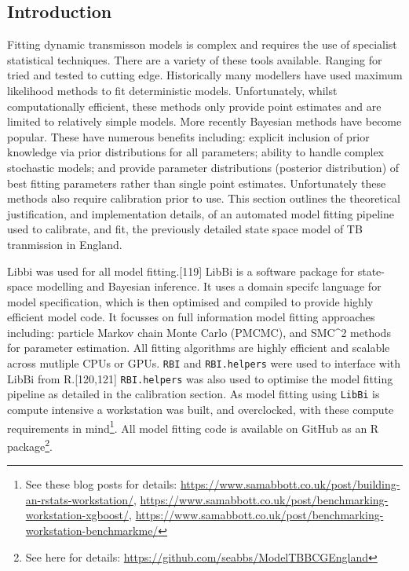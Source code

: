 \documentclass[11pt,twoside]{bristolthesis}
\begin{document}
  \hypertarget{introduction-8}{%
  \subsection{Introduction}\label{introduction-8}}
  
  Fitting dynamic transmisson models is complex and requires the use of specialist statistical techniques. There are a variety of these tools available. Ranging for tried and tested to cutting edge. Historically many modellers have used maximum likelihood methods to fit deterministic models. Unfortunately, whilst computationally efficient, these methods only provide point estimates and are limited to relatively simple models. More recently Bayesian methods have become popular. These have numerous benefits including: explicit inclusion of prior knowledge via prior distributions for all parameters; ability to handle complex stochastic models; and provide parameter distributions (posterior distribution) of best fitting parameters rather than single point estimates. Unfortunately these methods also require calibration prior to use. This section outlines the theoretical justification, and implementation details, of an automated model fitting pipeline used to calibrate, and fit, the previously detailed state space model of TB tranmission in England.
  
  Libbi was used for all model fitting.{[}119{]} LibBi is a software package for state-space modelling and Bayesian inference. It uses a domain specifc language for model specification, which is then optimised and compiled to provide highly efficient model code. It focusses on full information model fitting approaches including: particle Markov chain Monte Carlo (PMCMC), and SMC\^{}2 methods for parameter estimation. All fitting algorithms are highly efficient and scalable across mutliple CPUs or GPUs. \texttt{RBI} and \texttt{RBI.helpers} were used to interface with LibBi from R.{[}120,121{]} \texttt{RBI.helpers} was also used to optimise the model fitting pipeline as detailed in the calibration section. As model fitting using \texttt{LibBi} is compute intensive a workstation was built, and overclocked, with these compute requirements in mind\footnote{See these blog posts for details: \url{https://www.samabbott.co.uk/post/building-an-rstats-workstation/}, \url{https://www.samabbott.co.uk/post/benchmarking-workstation-xgboost/}, \url{https://www.samabbott.co.uk/post/benchmarking-workstation-benchmarkme/}}. All model fitting code is available on GitHub as an R package\footnote{See here for details: \url{https://github.com/seabbs/ModelTBBCGEngland}}.
  
\end{document}
